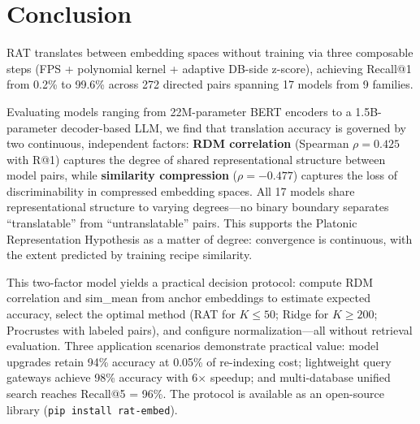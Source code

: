 \documentclass{article}
\begin{document}
\section{Conclusion}
\label{sec:conclusion}

RAT translates between embedding spaces without training via three composable steps (FPS + polynomial kernel + adaptive DB-side z-score), achieving Recall@1 from 0.2\% to 99.6\% across 272 directed pairs spanning 17 models from 9 families.

Evaluating models ranging from 22M-parameter BERT encoders to a 1.5B-parameter decoder-based LLM, we find that translation accuracy is governed by two continuous, independent factors: \textbf{RDM correlation} (Spearman $\rho = 0.425$ with R@1) captures the degree of shared representational structure between model pairs, while \textbf{similarity compression} ($\rho = -0.477$) captures the loss of discriminability in compressed embedding spaces. All 17 models share representational structure to varying degrees---no binary boundary separates ``translatable'' from ``untranslatable'' pairs. This supports the Platonic Representation Hypothesis as a matter of degree: convergence is continuous, with the extent predicted by training recipe similarity.

This two-factor model yields a practical decision protocol: compute RDM correlation and sim\_mean from anchor embeddings to estimate expected accuracy, select the optimal method (RAT for $K \le 50$; Ridge for $K \ge 200$; Procrustes with labeled pairs), and configure normalization---all without retrieval evaluation. Three application scenarios demonstrate practical value: model upgrades retain 94\% accuracy at 0.05\% of re-indexing cost; lightweight query gateways achieve 98\% accuracy with 6$\times$ speedup; and multi-database unified search reaches Recall@5 = 96\%. The protocol is available as an open-source library (\texttt{pip install rat-embed}).



\end{document}
